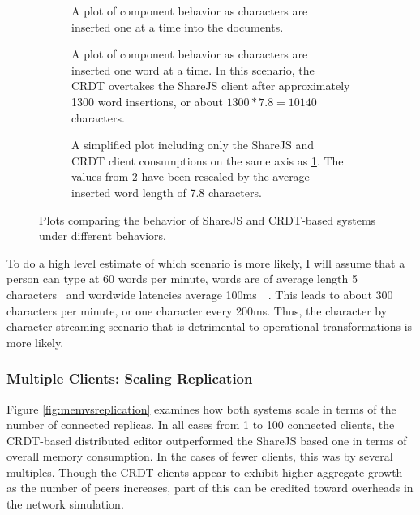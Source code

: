 \documentclass[12pt,a4paper,twoside,openright]{report}
\begin{document}
				\begin{figure} [H]
				\centering
				\begin{subfigure}[t]{.45\textwidth}
				  \centering
				  
				  \caption[Single Client Memory Consumption with Character Insertion] {A plot of component behavior as characters are inserted one at a time into the documents.}
				  \label{fig:sub1}
				\end{subfigure}%
				\begin{subfigure}[t]{.45\textwidth}
				  \centering
				  
				  \caption{A plot of component behavior as characters are inserted one word at a time. In this scenario, the CRDT overtakes the ShareJS client after approximately 1300 word insertions, or about $1300*7.8 = 10140$ characters.}
				  \label{fig:sub2}
				\end{subfigure}
				\begin{subfigure}[t]{0.6\textwidth}
				  \centering
			  	  
				  \caption{A simplified plot including only the ShareJS and CRDT client consumptions on the same axis as \ref{fig:sub1}. The values from \ref{fig:sub2} have been rescaled by the average inserted word length of 7.8 characters.}
				  \label{fig:sub3}
				\end{subfigure}
				\caption[Single Client Memory Consumption]{Plots comparing the behavior of ShareJS and CRDT-based systems under different behaviors.}
				\label{fig:singleclientmemory}
				\end{figure}
				
				To do a high level estimate of which scenario is more likely, I will assume that a person can type at 60 words per minute, words are of average length 5 characters~\cite{bochkarev2012average} and wordwide latencies average 100ms~\cite{latencies}~\cite{fccbroadband}. This leads to about 300 characters per minute, or one character every 200ms. Thus, the character by character streaming scenario that is detrimental to operational transformations is more likely.
					
					
				
				
			\subsubsection{Multiple Clients: Scaling Replication}
				Figure \ref{fig:memvsreplication} examines how both systems scale in terms of the number of connected replicas. In all cases from 1 to 100 connected clients, the CRDT-based distributed editor outperformed the ShareJS based one in terms of overall memory consumption. In the cases of fewer clients, this was by several multiples. Though the CRDT clients appear to exhibit higher aggregate growth as the number of peers increases, part of this can be credited toward overheads in the network simulation.
			
\end{document}
